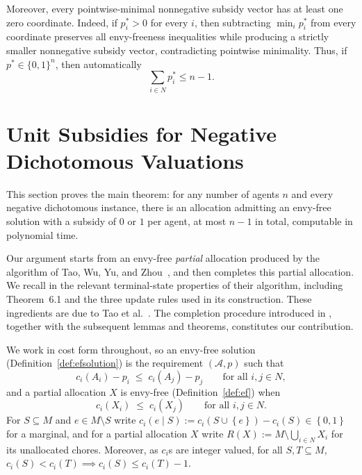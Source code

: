 \documentclass[11pt]{article}
\theoremstyle{plain}
\theoremstyle{plain}
\newcommand{\agents}{N}                       %
\newcommand{\items}{M}                        %
\newcommand{\bundle}[1]{A_{#1}}
\newcommand{\subsidy}{p}                      %
\newcommand{\optsubsidy}{p^{*}}               %
\newcommand{\cost}{c}
\newcommand{\set}[1]{\left\{#1\right\}}
\begin{document}
Moreover, every pointwise-minimal nonnegative subsidy vector has at least one zero coordinate. Indeed, if $\optsubsidy_i>0$ for every $i$, then subtracting $\min_i\optsubsidy_i$ from every coordinate preserves all envy-freeness inequalities while producing a strictly smaller nonnegative subsidy vector, contradicting pointwise minimality. Thus, if $\optsubsidy\in\{0,1\}^n$, then automatically
\[
    \sum_{i\in\agents}\optsubsidy_i\leq n-1.
\]

\section{Unit Subsidies for Negative Dichotomous Valuations}
\label{sec:main}

This section proves the main theorem: for any number of agents $n$ and every negative dichotomous instance, there is an allocation admitting an envy-free solution with a subsidy of $0$ or $1$ per agent, at most $n-1$ in total, computable in polynomial time. 


Our argument starts from an envy-free \emph{partial} allocation produced by the algorithm of Tao, Wu, Yu, and Zhou~\cite{tao2025existence}, and then completes this partial allocation. We recall in  the relevant terminal-state properties of their algorithm, including Theorem~6.1 and the three update rules used in its construction. These ingredients are due to Tao et al.~\cite{tao2025existence}. The completion procedure introduced in , together with the subsequent lemmas and theorems, constitutes our contribution.


We work in cost form throughout, so an envy-free solution (Definition~\ref{def:efsolution}) is the requirement $(\mathcal{A},p)$ such that
\begin{equation} \label{eq:m-ef}
  \cost_i(\bundle i) - \subsidy_i \;\le\; \cost_i(\bundle j) - \subsidy_j  \qquad \text{for all } i,j \in \agents ,
\end{equation} 
and a partial allocation $X$ is envy-free (Definition~\ref{def:ef}) when
\begin{equation} \label{eq:m-pef}
  \cost_i(X_i) \;\le\; \cost_i(X_j)
  \qquad \text{for all } i,j \in \agents .
\end{equation}
For $S \subseteq \items$ and $e \in \items \setminus S$ write $\cost_i(e \mid S) := \cost_i(S \cup \set e) - \cost_i(S) \in \set{0,1}$ for a marginal, and for a partial allocation $X$ write $R(X) := \items \setminus \bigcup_{i \in \agents} X_i$ for its unallocated chores.  Moreover, as $\cost_i$s are integer valued, for all $S,T\subseteq M$, \(\cost_i(S) < \cost_i(T) \implies \cost_i(S) \le \cost_i(T) - 1 .
 \)
\end{document}
